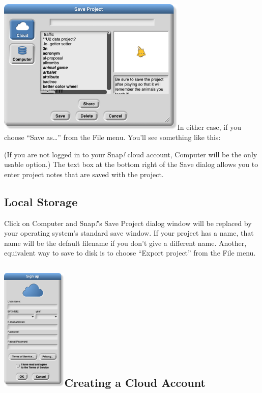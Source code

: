 \label{saveas}{}\includegraphics[width=3.54861in,height=2.57639in]{media/image487.png}In
either case, if you choose ``Save as\ldots'' from the File menu. You'll
see something like this:

(If you are not logged in to your Snap\emph{!} cloud account, Computer
will be the only usable option.) The text box at the bottom right of the
Save dialog allows you to enter project notes that are saved with the
project.

\subsection{Local Storage}\label{local-storage}

Click on Computer and Snap\emph{!}'s Save Project dialog window will be
replaced by your operating system's standard save window. If your
project has a name, that name will be the default filename if you don't
give a different name. Another, equivalent way to save to disk is to
choose ``Export project'' from the File menu.

\subsection[Creating a Cloud
Account]{\texorpdfstring{\protect\includegraphics[width=1.23403in,height=2.32986in]{media/image488.png}Creating
a Cloud
Account}{Creating a Cloud Account}}\label{creating-a-cloud-account}

